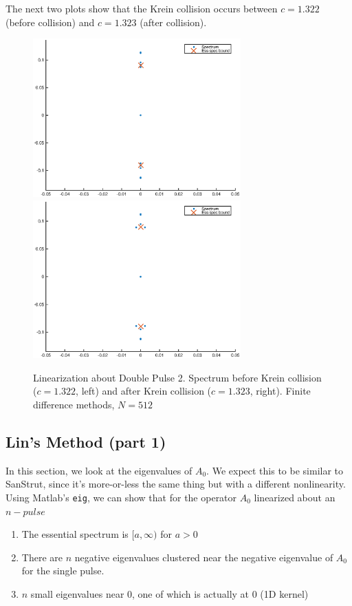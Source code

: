 \documentclass[12pt]{article}
\begin{document}
The next two plots show that the Krein collision occurs between $c = 1.322$ (before collision) and $c = 1.323$ (after collision).

\begin{figure}[H]
\centering
\includegraphics[width=8cm]{spec1322_double2.eps}
\includegraphics[width=8cm]{spec1323_double2.eps}
\caption{Linearization about Double Pulse 2. Spectrum before Krein collision ($c = 1.322$, left) and after Krein collision ($c = 1.323$, right). Finite difference methods, $N = 512$}
\end{figure}

\subsection{Lin's Method (part 1)}

In this section, we look at the eigenvalues of $A_0$. We expect this to be similar to SanStrut, since it's more-or-less the same thing but with a different nonlinearity. Using Matlab's \texttt{eig}, we can show that for the operator $A_0$ linearized about an $n-pulse$

\begin{enumerate}
	\item The essential spectrum is $[a, \infty)$ for $a > 0$
	\item There are $n$ negative eigenvalues clustered near the negative eigenvalue of $A_0$ for the single pulse.
	\item $n$ small eigenvalues near 0, one of which is actually at 0 (1D kernel)
\end{enumerate}
\end{document}
